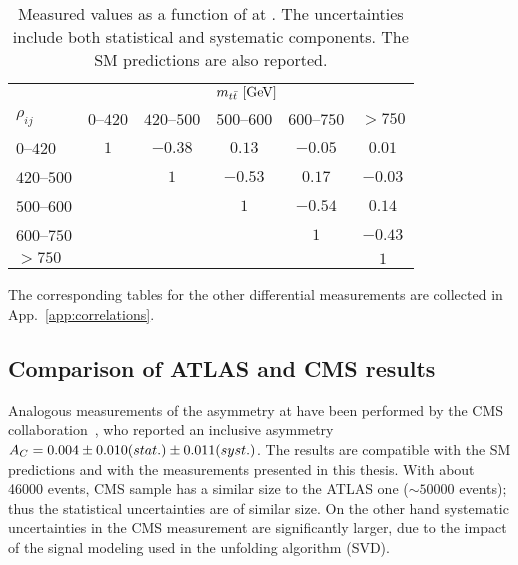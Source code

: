 \begin{table}[!htp]\centering
\begin{tabular}{l c c c c c }
  \toprule
  &\multicolumn{5}{c}{$m_{t\bar{t}}{}~[\rm{GeV}]$}    \\
  $\rho_{ij}$ & $0$--$420$ & $420$--$500$ & $500$--$600$ & $600$--$750$ & $>750$ \\
  \midrule
  $0$--$420$      & $1$ & $-0.38$ & $0.13$  & $-0.05$ & $0.01$  \\
  $420$--$500$    &     & $1$     & $-0.53$ & $0.17$  & $-0.03$ \\
  $500$--$600$    &     &         & $1$     & $-0.54$ & $0.14$  \\
  $600$--$750$    &     &         &         & $1$     & $-0.43$ \\
  $>750$          &     &         &         &         & $1$     \\
  \bottomrule
\end{tabular}
\label{tab:corr_mtt}
\caption{Measured \ac{} values as a function of \mtt{} at
  \seventev{}. The uncertainties include both statistical and
  systematic components. The SM predictions
  are also reported.}
\end{table}
The corresponding tables for the other differential measurements are
collected in App.~\ref{app:correlations}.

\subsection{Comparison of ATLAS and CMS results}

Analogous measurements of the asymmetry \ac{} at \seventev{} have been
performed by the CMS collaboration~\cite{Chatrchyan:2012cxa}, who
reported an inclusive asymmetry
$A_C{}=0.004\pm0.010(stat.)\pm0.011(syst.)$.
The results are compatible with the SM predictions and with the
measurements presented in this thesis. 
With about 46000 \ttbar{} events, CMS sample has a similar size to the
ATLAS one ($\sim50000$ events); thus the statistical uncertainties are
of similar size. On the other hand systematic uncertainties in the CMS
measurement are significantly larger, due to the impact of the signal
modeling used in the unfolding algorithm (SVD).

